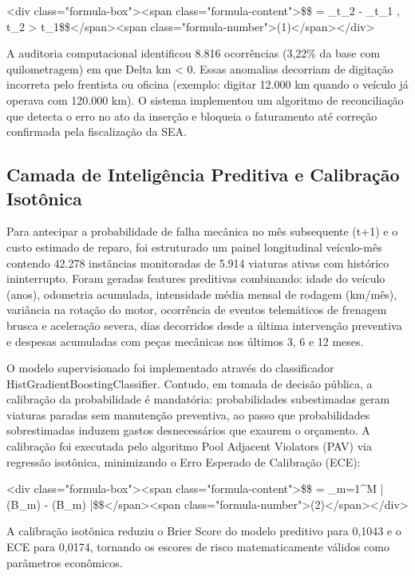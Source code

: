 \documentclass[12pt,a4paper]{article}
\begin{document}
<div class="formula-box"><span class="formula-content">\$\$\Delta {} = \_{t\_2} - \_{t\_1} , \quad \forall t\_2 > t\_1\$\$</span><span class="formula-number">(1)</span></div>

A auditoria computacional identificou 8.816 ocorrências (3,22\% da base com quilometragem) em que Delta km < 0. Essas anomalias decorriam de digitação incorreta pelo frentista ou oficina (exemplo: digitar 12.000 km quando o veículo já operava com 120.000 km). O sistema implementou um algoritmo de reconciliação que detecta o erro no ato da inserção e bloqueia o faturamento até correção confirmada pela fiscalização da SEA.


\subsection{Camada de Inteligência Preditiva e Calibração Isotônica}

Para antecipar a probabilidade de falha mecânica no mês subsequente (t+1) e o custo estimado de reparo, foi estruturado um painel longitudinal veículo-mês contendo 42.278 instâncias monitoradas de 5.914 viaturas ativas com histórico ininterrupto. Foram geradas features preditivas combinando: idade do veículo (anos), odometria acumulada, intensidade média mensal de rodagem (km/mês), variância na rotação do motor, ocorrência de eventos telemáticos de frenagem brusca e aceleração severa, dias decorridos desde a última intervenção preventiva e despesas acumuladas com peças mecânicas nos últimos 3, 6 e 12 meses.

O modelo supervisionado foi implementado através do classificador HistGradientBoostingClassifier. Contudo, em tomada de decisão pública, a calibração da probabilidade é mandatória: probabilidades subestimadas geram viaturas paradas sem manutenção preventiva, ao passo que probabilidades sobrestimadas induzem gastos desnecessários que exaurem o orçamento. A calibração foi executada pelo algoritmo Pool Adjacent Violators (PAV) via regressão isotônica, minimizando o Erro Esperado de Calibração (ECE):

<div class="formula-box"><span class="formula-content">\$\$ = \sum\_{m=1}^{M}  \left| (B\_m) - (B\_m) \right|\$\$</span><span class="formula-number">(2)</span></div>

A calibração isotônica reduziu o Brier Score do modelo preditivo para 0,1043 e o ECE para 0,0174, tornando os escores de risco matematicamente válidos como parâmetros econômicos.
\end{document}
